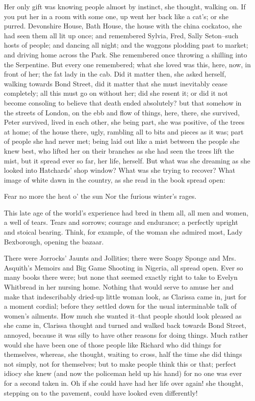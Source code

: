 \documentclass[lang=cn,10pt]{elegantbook}
\begin{document}
Her only gift was knowing people almost by instinct, she thought,
walking on.  If you put her in a room with some one, up went her
back like a cat's; or she purred.  Devonshire House, Bath House,
the house with the china cockatoo, she had seen them all lit up
once; and remembered Sylvia, Fred, Sally Seton--such hosts of
people; and dancing all night; and the waggons plodding past to
market; and driving home across the Park.  She remembered once
throwing a shilling into the Serpentine.  But every one remembered;
what she loved was this, here, now, in front of her; the fat lady
in the cab.  Did it matter then, she asked herself, walking towards
Bond Street, did it matter that she must inevitably cease
completely; all this must go on without her; did she resent it; or
did it not become consoling to believe that death ended absolutely?
but that somehow in the streets of London, on the ebb and flow of
things, here, there, she survived, Peter survived, lived in each
other, she being part, she was positive, of the trees at home; of
the house there, ugly, rambling all to bits and pieces as it was;
part of people she had never met; being laid out like a mist
between the people she knew best, who lifted her on their branches
as she had seen the trees lift the mist, but it spread ever so far,
her life, herself.  But what was she dreaming as she looked into
Hatchards' shop window?  What was she trying to recover?  What
image of white dawn in the country, as she read in the book spread
open:


     Fear no more the heat o' the sun
     Nor the furious winter's rages.


This late age of the world's experience had bred in them all, all
men and women, a well of tears.  Tears and sorrows; courage and
endurance; a perfectly upright and stoical bearing.  Think, for
example, of the woman she admired most, Lady Bexborough, opening
the bazaar.

There were Jorrocks' Jaunts and Jollities; there were Soapy Sponge
and Mrs. Asquith's Memoirs and Big Game Shooting in Nigeria, all
spread open.  Ever so many books there were; but none that seemed
exactly right to take to Evelyn Whitbread in her nursing home.
Nothing that would serve to amuse her and make that indescribably
dried-up little woman look, as Clarissa came in, just for a moment
cordial; before they settled down for the usual interminable talk
of women's ailments.  How much she wanted it--that people should
look pleased as she came in, Clarissa thought and turned and walked
back towards Bond Street, annoyed, because it was silly to have
other reasons for doing things.  Much rather would she have been
one of those people like Richard who did things for themselves,
whereas, she thought, waiting to cross, half the time she did
things not simply, not for themselves; but to make people think
this or that; perfect idiocy she knew (and now the policeman held
up his hand) for no one was ever for a second taken in.  Oh if she
could have had her life over again! she thought, stepping on to the
pavement, could have looked even differently!
\end{document}
